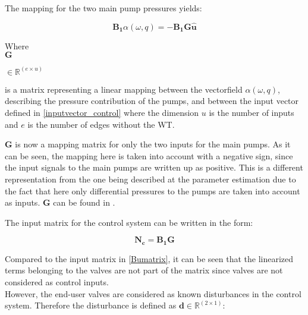The mapping for the two main pump pressures yields:

\begin{equation}
\bm{B_1} \alpha(\omega,q) = -\bm{B_1} \bm{G} \bm{\hat{u}}
\label{mapping_main}
\end{equation}

\begin{minipage}[t]{0.12\textwidth}
Where\\
\hspace*{8mm} $\bm{G}$ 
\end{minipage}
\begin{minipage}[t]{0.12\textwidth}
\vspace*{2mm}$\in \pmb{\mathbb{R}}^{(e \times u)} $ 
\end{minipage}
\begin{minipage}[t]{0.74\textwidth}
\vspace*{2mm}
is a matrix representing a linear mapping between the vectorfield $\alpha(\omega,q)$, describing the pressure contribution of the pumps, and between the input vector defined in \eqref{inputvector_control} where the dimension $u$ is the number of inputs and $e$ is the number of edges without the WT. 
\end{minipage} 

$\bm{G}$ is now a mapping matrix for only the two inputs for the main pumps. As it can be seen, the mapping here is taken into account with a negative sign, since the input signals to the main pumps are written up as positive. This is a different representation from the one being described at the parameter estimation due to the fact that here only differential pressures to the pumps are taken into account as inputs. $\bm{G}$ can be found in .

The input matrix for the control system can be written in the form: 

\begin{equation}
  \bm{N_c} =  \bm{B_1}\bm{G}  
\label{inputmatrix_control}	
\end{equation}

Compared to the input matrix in \eqref{Bumatrix}, it can be seen that the linearized terms belonging to the valves are not part of the matrix since valves are not considered as control inputs. 
\\
However, the end-user valves are considered as known disturbances in the control system. Therefore the disturbance is defined as $\bm{d} \in \pmb{\mathbb{R}}^{(2 \times 1)}$: 

